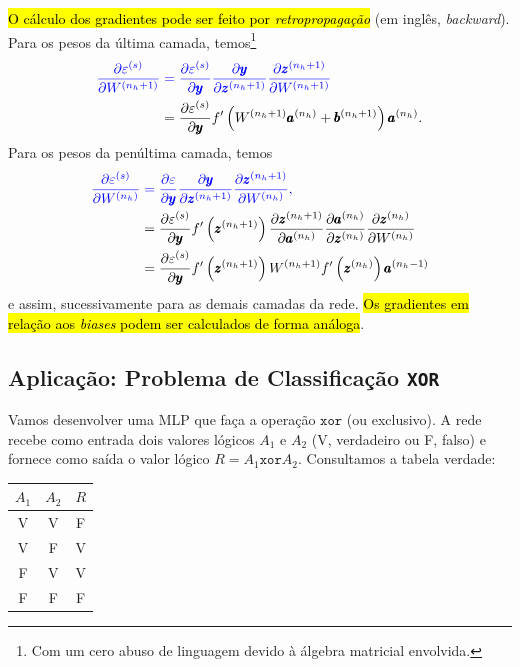 \hl{O cálculo dos gradientes pode ser feito por \emph{retropropagação}} (em inglês, \textit{backward}). Para os pesos da última camada, temos\footnote{Com um cero abuso de linguagem devido à álgebra matricial envolvida.}
\begin{align}
  \color{blue}\frac{\partial\varepsilon^{(s)}}{\partial W^{(n_h+1)}} &\color{blue}= \frac{\partial\varepsilon^{(s)}}{\partial\pmb{y}}\frac{\partial\pmb{y}}{\partial\pmb{z}^{(n_h+1)}}\frac{\partial\pmb{z}^{(n_h+1)}}{\partial W^{(n_h+1)}}  \\
                             &= \frac{\partial\varepsilon^{(s)}}{\partial\pmb{y}}f'\left(W^{(n_h+1)}\pmb{a}^{(n_h)}+\pmb{b}^{(n_h+1)}\right)\pmb{a}^{(n_h)}.
\end{align}
Para os pesos da penúltima camada, temos
\begin{align}
  \color{blue}\frac{\partial\varepsilon^{(s)}}{\partial W^{(n_h)}} &\color{blue}= \frac{\partial\varepsilon}{\partial\pmb{y}}\frac{\partial\pmb{y}}{\partial\pmb{z}^{(n_h+1)}}\frac{\partial\pmb{z}^{(n_h+1)}}{\partial W^{(n_h)}},\\
                                     &= \frac{\partial\varepsilon^{(s)}}{\partial\pmb{y}}f'\left(\pmb{z}^{(n_h+1)}\right)\frac{\partial\pmb{z}^{(n_h+1)}}{\partial\pmb{a}^{(n_h)}}\frac{\partial\pmb{a}^{(n_h)}}{\partial\pmb{z}^{(n_h)}}\frac{\partial\pmb{z}^{(n_h)}}{\partial W^{(n_h)}}\\
                                     &= \frac{\partial\varepsilon^{(s)}}{\partial\pmb{y}}f'\left(\pmb{z}^{(n_h+1)}\right)W^{(n_h+1)}f'\left(\pmb{z}^{(n_h)}\right)\pmb{a}^{(n_h-1)}
\end{align}
e assim, sucessivamente para as demais camadas da rede. \hl{Os gradientes em relação aos \textit{biases} podem ser calculados de forma análoga}.

\subsection{Aplicação: Problema de Classificação \texttt{XOR}}

Vamos desenvolver uma MLP que faça a operação $\texttt{xor}$ (ou exclusivo). A rede recebe como entrada dois valores lógicos $A_1$ e $A_2$ (V, verdadeiro ou F, falso) e fornece como saída o valor lógico $R = A_1 \texttt{xor} A_2$. Consultamos a tabela verdade:

\begin{center}
  \begin{tabular}{cc|c}
    $A_1$ & $A_2$ & $R$\\\hline
    V & V & F\\
    V & F & V\\
    F & V & V\\
    F & F & F\\\hline
  \end{tabular}
\end{center}

